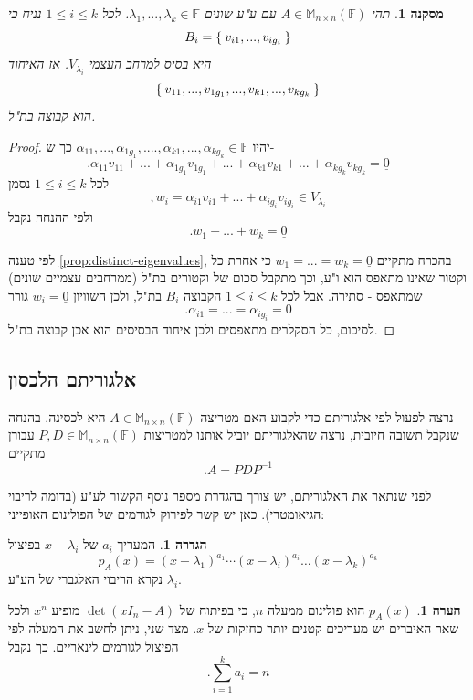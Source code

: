 \documentclass[12pt]{report}
\theoremstyle{plain}
\newtheorem{corollary}[theorem]{מסקנה}
\theoremstyle{definition}
\newtheorem{definition}[theorem]{הגדרה}
\newtheorem{remark}{הערה}[chapter]
\newcommand{\F}{\mathbb{F}}
\newcommand{\M}{\mathbb{M}}
\newcommand{\0}{\mathbf{0}}
\begin{document}
\begin{corollary}\label{cor:eigenspace-union}
תהי
$A\in\M_{n\times n}(\F)$
עם ע"ע שונים
$\lambda_1,...,\lambda_k\in\F$.
לכל 
$1\leq i\leq k$
נניח כי
$$
B_i=\Set{v_{i1},...,v_{ig_i}}
$$
היא בסיס למרחב העצמי 
$V_{\lambda_i}$.
אז האיחוד
$$
\Set{v_{11},...,v_{1g_1},...,v_{k1},...,v_{kg_k}}
$$
הוא קבוצה בת"ל.
\end{corollary}

\begin{proof}
יהיו
$\alpha_{11},...,\alpha_{1g_1},....,\alpha_{k1},...,\alpha_{kg_k}\in\F$
כך ש-
$$
.\alpha_{11} v_{11}+...+\alpha_{1g_1}v_{1g_1}+...+\alpha_{k1}v_{k1}+...+\alpha_{kg_k}v_{kg_k}=\underline{0}
$$
לכל
$1\leq i\leq k$
נסמן
$$
,w_i=\alpha_{i1}v_{i1}+...+\alpha_{ig_i}v_{ig_i}\in V_{\lambda_i}
$$
ולפי ההנחה נקבל
$$
.w_1+...+w_k=\underline{0}
$$

לפי טענה
\ref{prop:distinct-eigenvalues},
בהכרח מתקיים
$w_1=...=w_k=\underline{0}$
כי אחרת כל וקטור שאינו מתאפס הוא ו"ע, וכך מתקבל סכום של וקטורים בת"ל (ממרחבים עצמיים שונים) שמתאפס - סתירה. אבל לכל
$1\leq i\leq k$
הקבוצה
$B_i$
בת"ל, ולכן השוויון
$w_i=\underline{0}$
גורר
$$
.\alpha_{i1}=...=\alpha_{ig_i}=0
$$
לסיכום, כל הסקלרים מתאפסים ולכן איחוד הבסיסים הוא אכן קבוצה בת"ל.
\end{proof}

\subsection{אלגוריתם הלכסון}

נרצה לפעול לפי אלגוריתם כדי לקבוע האם מטריצה
$A\in\M_{n\times n}(\F)$
היא לכסינה. בהנחה שנקבל תשובה חיובית, נרצה שהאלגוריתם יוביל אותנו למטריצות
$P,D\in\M_{n\times n}(\F)$
עבורן מתקיים
$$
.A=PDP^{-1}
$$

לפני שנתאר את האלגוריתם, יש צורך בהגדרת מספר נוסף הקשור לע"ע (בדומה לריבוי הגיאומטרי). כאן יש קשר לפירוק לגורמים של הפולינום האופייני:

\begin{definition}
המעריך 
$a_i$
של
$x-\lambda_i$
בפיצול
$$
p_A(x)=(x-\lambda_1)^{a_1}\cdots(x-\lambda_i)^{a_i}\dots(x-\lambda_k)^{a_k}
$$
נקרא הריבוי האלגברי של הע"ע
$\lambda_i$.
\end{definition}

\begin{remark}
$p_A(x)$
הוא פולינום ממעלה 
$n$,
כי בפיתוח של 
$\det(xI_n-A)$
מופיע 
$x^n$
ולכל שאר האיברים יש מעריכים קטנים יותר כחזקות של
$x$. 
מצד שני, ניתן לחשב את המעלה לפי הפיצול לגורמים לינאריים. כך נקבל
$$
.\sum_{i=1}^k a_i=n
$$
\end{remark}
\end{document}

